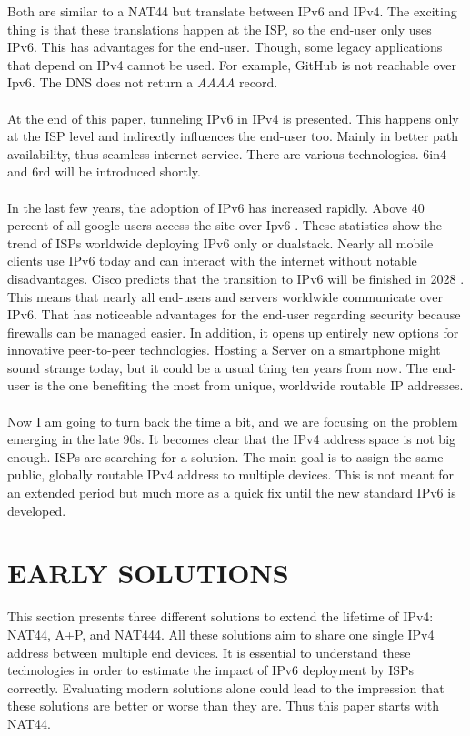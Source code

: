 \documentclass[format=sigconf, natbib=true, nonacm=true]{acmart}
\begin{document}
Both are similar to a NAT44 but translate between IPv6 and IPv4. The exciting thing is that these translations happen at the ISP, so the end-user only uses IPv6. This has advantages for the end-user. Though, some legacy applications that depend on IPv4 cannot be used. For example, GitHub is not reachable over Ipv6. The DNS does not return a \textit{AAAA} record.\\\\At the end of this paper, tunneling IPv6 in IPv4 is presented. This happens only at the ISP level and indirectly influences the end-user too. Mainly in better path availability, thus seamless internet service. There are various technologies. 6in4 and 6rd will be introduced shortly.\\\\In the last few years, the adoption of IPv6 has increased rapidly. Above 40 percent of all google users access the site over Ipv6 \cite{GoogleIPv6}. These statistics show the trend of ISPs worldwide deploying IPv6 only or dualstack. Nearly all mobile clients use IPv6 today and can interact with the internet without notable disadvantages. Cisco predicts that the transition to IPv6 will be finished in 2028 \cite{Hughes2022_C05}. This means that nearly all end-users and servers worldwide communicate over IPv6. That has noticeable advantages for the end-user regarding security because firewalls can be managed easier. In addition, it opens up entirely new options for innovative peer-to-peer technologies. Hosting a Server on a smartphone might sound strange today, but it could be a usual thing ten years from now. The end-user is the one benefiting the most from unique, worldwide routable IP addresses.\\\\Now I am going to turn back the time a bit, and we are focusing on the problem emerging in the late 90s. It becomes clear that the IPv4 address space is not big enough. ISPs are searching for a solution. The main goal is to assign the same public, globally routable IPv4 address to multiple devices. This is not meant for an extended period but much more as a quick fix until the new standard IPv6 is developed.
    
    \section{EARLY SOLUTIONS}
    This section presents three different solutions to extend the lifetime of IPv4: NAT44, A+P, and NAT444. All these solutions aim to share one single IPv4 address between multiple end devices. It is essential to understand these technologies in order to estimate the impact of IPv6 deployment by ISPs correctly. Evaluating modern solutions alone could lead to the impression that these solutions are better or worse than they are. Thus this paper starts with NAT44.
\end{document}
